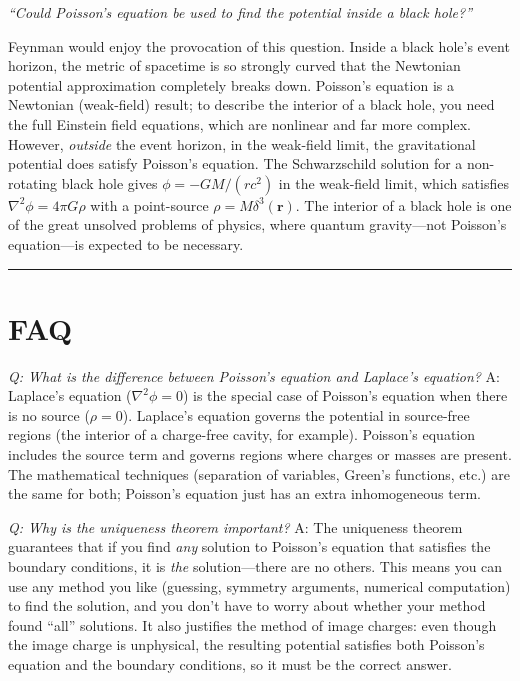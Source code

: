 \textit{``Could Poisson's equation be used to find the potential inside a black hole?''}

Feynman would enjoy the provocation of this question. Inside a black hole's event horizon, the metric of spacetime is so strongly curved that the Newtonian potential approximation completely breaks down. Poisson's equation is a Newtonian (weak-field) result; to describe the interior of a black hole, you need the full Einstein field equations, which are nonlinear and far more complex. However, \emph{outside} the event horizon, in the weak-field limit, the gravitational potential does satisfy Poisson's equation. The Schwarzschild solution for a non-rotating black hole gives $\phi = -GM/(rc^2)$ in the weak-field limit, which satisfies $\nabla^2\phi = 4\pi G\rho$ with a point-source $\rho = M\delta^3(\mathbf{r})$. The interior of a black hole is one of the great unsolved problems of physics, where quantum gravity---not Poisson's equation---is expected to be necessary.

\bigskip
\hrule
\bigskip
\section*{FAQ}

\textit{Q: What is the difference between Poisson's equation and Laplace's equation?}
A: Laplace's equation ($\nabla^2\phi = 0$) is the special case of Poisson's equation when there is no source ($\rho = 0$). Laplace's equation governs the potential in source-free regions (the interior of a charge-free cavity, for example). Poisson's equation includes the source term and governs regions where charges or masses are present. The mathematical techniques (separation of variables, Green's functions, etc.) are the same for both; Poisson's equation just has an extra inhomogeneous term.

\textit{Q: Why is the uniqueness theorem important?}
A: The uniqueness theorem guarantees that if you find \emph{any} solution to Poisson's equation that satisfies the boundary conditions, it is \emph{the} solution---there are no others. This means you can use any method you like (guessing, symmetry arguments, numerical computation) to find the solution, and you don't have to worry about whether your method found ``all'' solutions. It also justifies the method of image charges: even though the image charge is unphysical, the resulting potential satisfies both Poisson's equation and the boundary conditions, so it must be the correct answer.

